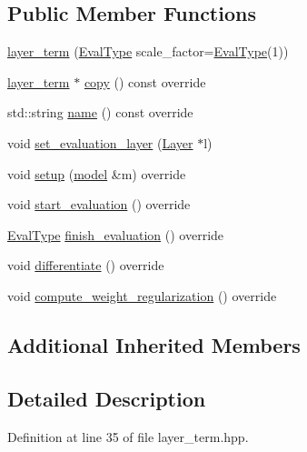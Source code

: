 \subsection*{Public Member Functions}
\begin{DoxyCompactItemize}
\item 
\hyperlink{classlbann_1_1layer__term_a5c9eec2b5212adc5dc947ba2e9c88802}{layer\+\_\+term} (\hyperlink{base_8hpp_a3266f5ac18504bbadea983c109566867}{Eval\+Type} scale\+\_\+factor=\hyperlink{base_8hpp_a3266f5ac18504bbadea983c109566867}{Eval\+Type}(1))
\item 
\hyperlink{classlbann_1_1layer__term}{layer\+\_\+term} $\ast$ \hyperlink{classlbann_1_1layer__term_a20820da7fd752572579a2dbaaae2ed24}{copy} () const override
\item 
std\+::string \hyperlink{classlbann_1_1layer__term_a4942422215408e724e68b5df8b20b715}{name} () const override
\item 
void \hyperlink{classlbann_1_1layer__term_a04ca36543288fb9c55ab99cc0cc2a648}{set\+\_\+evaluation\+\_\+layer} (\hyperlink{classlbann_1_1Layer}{Layer} $\ast$l)
\item 
void \hyperlink{classlbann_1_1layer__term_ae6d84339fb80384ca2bf898fb854a7c9}{setup} (\hyperlink{classlbann_1_1model}{model} \&m) override
\item 
void \hyperlink{classlbann_1_1layer__term_ae2ab6b694701db724345573416ce0427}{start\+\_\+evaluation} () override
\item 
\hyperlink{base_8hpp_a3266f5ac18504bbadea983c109566867}{Eval\+Type} \hyperlink{classlbann_1_1layer__term_a2b0fdcf6a0dd7bea797b5ef1b4082f70}{finish\+\_\+evaluation} () override
\item 
void \hyperlink{classlbann_1_1layer__term_a857df1636853ea9b805611c55ff791e3}{differentiate} () override
\item 
void \hyperlink{classlbann_1_1layer__term_ab082c3a6feb225abb8e55595373532bf}{compute\+\_\+weight\+\_\+regularization} () override
\end{DoxyCompactItemize}
\subsection*{Additional Inherited Members}


\subsection{Detailed Description}


Definition at line 35 of file layer\+\_\+term.\+hpp.



